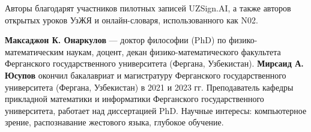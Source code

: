 \documentclass[a4paper,fleqn]{cas-dc}
\begin{document}
Авторы благодарят участников пилотных записей UZSign.AI, а также авторов открытых уроков УзЖЯ и онлайн-словаря, использованного как N02.



\bio{}
\textbf{Максаджон К. Онаркулов} — доктор философии (PhD) по физико-математическим наукам, доцент, декан физико-математического факультета Ферганского государственного университета (Фергана, Узбекистан).
\endbio
\bio{}
\textbf{Мирсаид А. Юсупов} окончил бакалавриат и магистратуру Ферганского государственного университета (Фергана, Узбекистан) в 2021 и 2023 гг. Преподаватель кафедры прикладной математики и информатики Ферганского государственного университета, работает над диссертацией PhD. Научные интересы: компьютерное зрение, распознавание жестового языка, глубокое обучение.
\endbio
\end{document}
